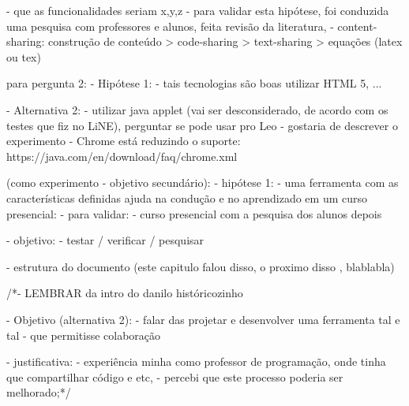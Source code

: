                         - que as funcionalidades seriam x,y,z
                            - para validar esta hipótese, foi conduzida uma pesquisa com professores e alunos, feita revisão da literatura, 
                        - content-sharing: construção de conteúdo > code-sharing > text-sharing > equações (latex ou tex)

                    para pergunta 2:
                        - Hipótese 1:
                            - tais tecnologias são boas utilizar HTML 5, ...

                            - Alternativa 2:
                                - utilizar java applet (vai ser desconsiderado, de acordo com os testes que fiz no LiNE), perguntar se pode usar pro Leo - gostaria de descrever o experimento
                                - Chrome está reduzindo o suporte:
                                    https://java.com/en/download/faq/chrome.xml

                    (como experimento - objetivo secundário):
                        - hipótese 1:
                            - uma ferramenta com as características definidas ajuda na condução e no aprendizado em um curso presencial:
                            - para validar:
                                - curso presencial com a pesquisa dos alunos depois

            - objetivo:
                - testar / verificar / pesquisar

            - estrutura do documento (este capitulo falou disso, o proximo disso , blablabla)

            /*- LEMBRAR da intro do danilo históricozinho


            - Objetivo (alternativa 2):
                - falar das projetar e desenvolver uma ferramenta tal e tal
                - que permitisse colaboração

                - justificativa:
                    - experiência minha como professor de programação, onde tinha que compartilhar código e etc,
                    - percebi que este processo poderia ser melhorado;*/

